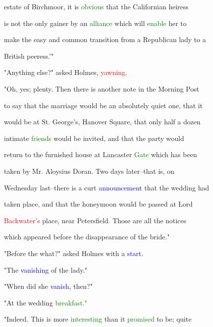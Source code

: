  estate of Birchmoor, it is \textcolor{green}{obvious} that the Californian heiress

 is not the only gainer by an \textcolor{green}{alliance} which will \textcolor{green}{enable} her to

 make the easy and common transition from a Republican lady to a

 British peeress.'"



 "Anything else?" asked Holmes, \textcolor{red}{yawning.}



 "Oh, yes; plenty. Then there is another note in the Morning Post

 to say that the \textcolor{BurntOrange}{marriage} would be an absolutely \textcolor{BurntOrange}{quiet} one, that it

 would be at St. George's, Hanover Square, that only half a dozen

 \textcolor{BurntOrange}{intimate} \textcolor{green}{friends} would be \textcolor{BurntOrange}{invited,} and that the party would

 return to the furnished house at Lancaster \textcolor{green}{Gate} which has been

 taken by Mr. Aloysius Doran. Two days later--that is, on

 Wednesday last--there is a curt \textcolor{blue}{announcement} that the wedding had

 taken place, and that the \textcolor{BurntOrange}{honeymoon} would be passed at \textcolor{BurntOrange}{Lord}

 \textcolor{red}{Backwater's} place, near Petersfield. Those are all the notices

 which appeared before the disappearance of the \textcolor{BurntOrange}{bride."}



 "Before the what?" asked Holmes with a \textcolor{blue}{start.}



 "The \textcolor{blue}{vanishing} of the lady."



 "When did she \textcolor{blue}{vanish,} then?"



 "At the wedding \textcolor{green}{breakfast."}



 "Indeed. This is more \textcolor{green}{interesting} than it \textcolor{green}{promised} to be; quite

